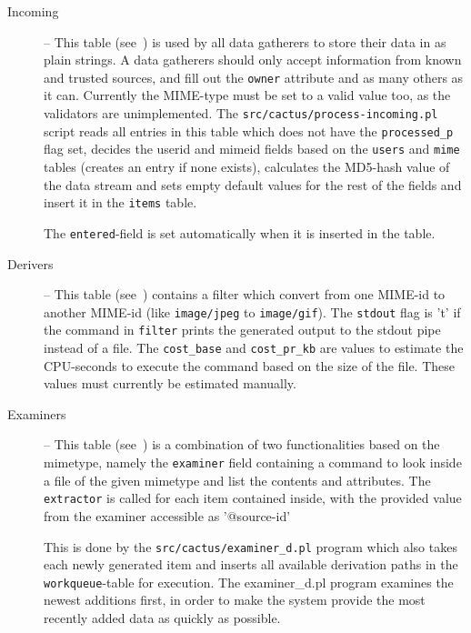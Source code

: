 \begin{description}

\item[Incoming] -- This table (see~) is used
by all data gatherers to store their data in as plain strings.  A data
gatherers should only accept information from known and trusted
sources, and fill out the \texttt{owner} attribute and as many others
as it can.  Currently the MIME-type must be set to a valid value too,
as the validators are unimplemented.  The
\texttt{src/cactus/process-incoming.pl} script reads all entries in
this table which does not have the \texttt{processed\_p} flag set,
decides the userid and mimeid fields based on the \texttt{users} and
\texttt{mime} tables (creates an entry if none exists), calculates the
MD5-hash value of the data stream and sets empty default values for
the rest of the fields and insert it in the \texttt{items} table.

  The \texttt{entered}-field is set automatically when it is inserted
  in the table.



%  

\item[Derivers] -- This table (see~) contains
  a filter which convert from one MIME-id to another MIME-id (like
  \texttt{image/jpeg} to \texttt{image/gif}).  The \texttt{stdout}
  flag is 't' if the command in \texttt{filter} prints the generated
  output to the stdout pipe instead of a file.  The
  \texttt{cost\_base} and \texttt{cost\_pr\_kb} are values to estimate
  the CPU-seconds to execute the command based on the size of the
  file.  These values must currently be estimated manually.



\item[Examiners] -- This table (see~) is a
combination of two functionalities based on the mimetype, namely the
\texttt{examiner} field containing a command to look inside a file of
the given mimetype and list the contents and attributes.  The
\texttt{extractor} is called for each item contained inside, with the
provided value from the examiner accessible as '{@source-id}'

This is done by the \texttt{src/cactus/examiner\_d.pl} program which
also takes each newly generated item and inserts all available
derivation paths in the \texttt{workqueue}-table for execution.  The
examiner\_d.pl program examines the newest additions first, in order
to make the system provide the most recently added data as quickly as
possible.


\end{description}
